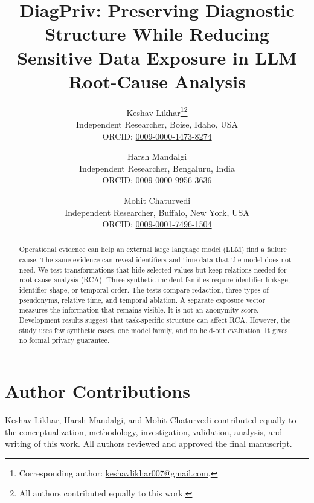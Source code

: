 \documentclass[11pt]{article}
\title{DiagPriv: Preserving Diagnostic Structure While Reducing Sensitive Data Exposure in LLM Root-Cause Analysis}
\author{
Keshav Likhar\thanks{Corresponding author: \href{mailto:keshavlikhar007@gmail.com}{keshavlikhar007@gmail.com}.}\thanks{All authors contributed equally to this work.}\\
\small Independent Researcher, Boise, Idaho, USA\\
\small ORCID: \href{https://orcid.org/0009-0000-1473-8274}{0009-0000-1473-8274}
\and
Harsh Mandalgi\\
\small Independent Researcher, Bengaluru, India\\
\small ORCID: \href{https://orcid.org/0009-0000-9956-3636}{0009-0000-9956-3636}
\and
Mohit Chaturvedi\\
\small Independent Researcher, Buffalo, New York, USA\\
\small ORCID: \href{https://orcid.org/0009-0001-7496-1504}{0009-0001-7496-1504}
}
\date{}
\begin{document}
\maketitle
\begin{abstract}
Operational evidence can help an external large language model (LLM) find a
failure cause. The same evidence can reveal identifiers and time data that the
model does not need. We test transformations that hide selected values but
keep relations needed for root-cause analysis (RCA). Three synthetic incident
families require identifier linkage, identifier shape, or temporal order.
The tests compare redaction, three types of pseudonyms, relative time, and
temporal ablation. A separate exposure vector measures the information that
remains visible. It is not an anonymity score. Development results suggest
that task-specific structure can affect RCA. However, the study uses few
synthetic cases, one model family, and no held-out evaluation. It gives no
formal privacy guarantee.
\end{abstract}















\section*{Author Contributions}
Keshav Likhar, Harsh Mandalgi, and Mohit Chaturvedi contributed equally to
the conceptualization, methodology, investigation, validation, analysis,
and writing of this work. All authors reviewed and approved the final
manuscript.



\end{document}
